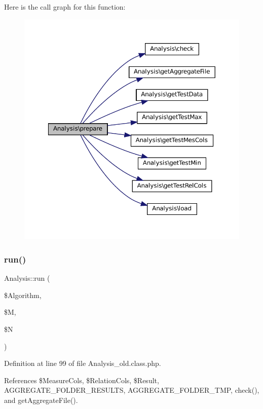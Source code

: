 Here is the call graph for this function\+:\nopagebreak
\begin{figure}[H]
\begin{center}
\leavevmode
\includegraphics[width=350pt]{class_analysis_ab640c304003ffe30395f331260b4c83c_cgraph}
\end{center}
\end{figure}
\mbox{\label{class_analysis_ac77d374d171fd92c5f693a04feff456b}} 
\subsubsection{\texorpdfstring{run()}{run()}}
{\footnotesize\ttfamily Analysis\+::run (\begin{DoxyParamCaption}\item[{}]{\$\+Algorithm,  }\item[{}]{\$M,  }\item[{}]{\$N }\end{DoxyParamCaption})}



Definition at line 99 of file Analysis\+\_\+old.\+class.\+php.



References \$\+Measure\+Cols, \$\+Relation\+Cols, \$\+Result, A\+G\+G\+R\+E\+G\+A\+T\+E\+\_\+\+F\+O\+L\+D\+E\+R\+\_\+\+R\+E\+S\+U\+L\+TS, A\+G\+G\+R\+E\+G\+A\+T\+E\+\_\+\+F\+O\+L\+D\+E\+R\+\_\+\+T\+MP, check(), and get\+Aggregate\+File().

